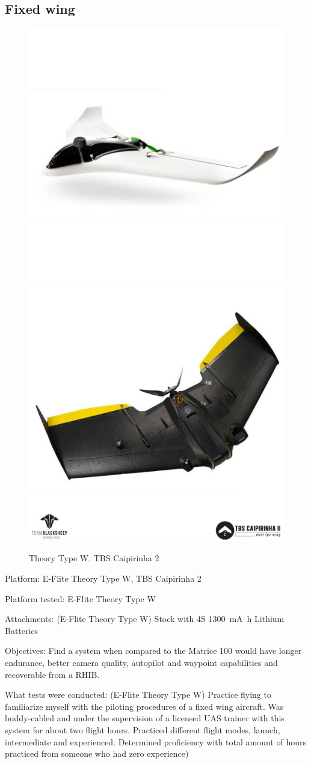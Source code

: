 \subsection{Fixed wing}
\begin{figure}
\begin{center}
\includegraphics[width=0.49\columnwidth]{figures/survey2a.png}
\includegraphics[width=0.49\columnwidth]{figures/survey2b.png}
\end{center}
\caption{Theory Type W. TBS Caipirinha 2}
\end{figure}

Platform: E-Flite Theory Type W, TBS Caipirinha 2

Platform tested: E-Flite Theory Type W

Attachments: (E-Flite Theory Type W) Stock with 4S \SI{1300}{\milli\ampere\hour} Lithium Batteries 

Objectives: Find a system when compared to the Matrice 100 would have longer endurance, better camera quality, autopilot and waypoint capabilities and recoverable from a RHIB.

What tests were conducted: (E-Flite Theory Type W) Practice flying to familiarize myself with the piloting procedures of a fixed wing aircraft. Was buddy-cabled and under the supervision of a licensed UAS trainer with this system for about two flight hours. Practiced different flight modes, launch, intermediate and experienced. Determined proficiency with total amount of hours practiced from someone who had zero experience)

